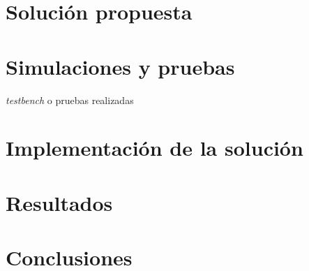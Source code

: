 \documentclass[journal]{IEEEtran}
\begin{document}


\section{Solución propuesta}

\section{Simulaciones y pruebas}
\emph{testbench} o pruebas realizadas

\section{Implementación de la solución}

\section{Resultados}

\section{Conclusiones}


\ifCLASSOPTIONcaptionsoff
  \newpage
\fi
\end{document}
